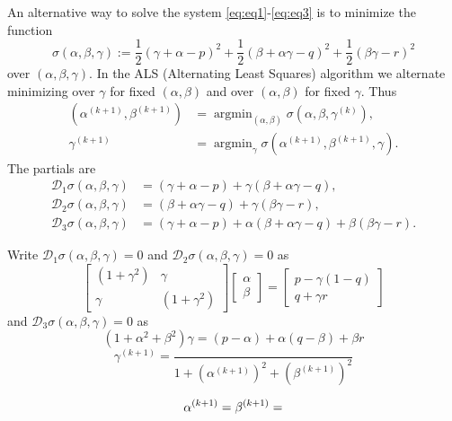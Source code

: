\documentclass[
  12pt,
]{article}
\begin{document}
An alternative way to solve the system \eqref{eq:eq1}-\eqref{eq:eq3} is to minimize the function
\begin{equation}
\sigma(\alpha,\beta,\gamma):=\frac12(\gamma+\alpha-p)^2+\frac12(\beta+\alpha\gamma-q)^2+\frac12(\beta\gamma-r)^2
\label{eq:lsloss}
\end{equation}
over \((\alpha,\beta,\gamma)\). In the ALS (Alternating Least Squares) algorithm we alternate
minimizing over \(\gamma\) for fixed \((\alpha,\beta)\) and over \((\alpha,\beta)\) for fixed \(\gamma\). Thus
\begin{align}
(\alpha^{(k+1)},\beta^{(k+1)})&=\mathop{\text{argmin}}_{(\alpha,\beta)}\sigma(\alpha,\beta,\gamma^{(k)}),\\
\gamma^{(k+1)}&=\mathop{\text{argmin}}_\gamma\sigma(\alpha^{(k+1)},\beta^{(k+1)},\gamma).
\end{align}
The partials are
\begin{align}
\mathcal{D}_1\sigma(\alpha,\beta,\gamma)&=(\gamma+\alpha-p)+\gamma(\beta+\alpha\gamma-q),\\
\mathcal{D}_2\sigma(\alpha,\beta,\gamma)&=(\beta+\alpha\gamma-q)+\gamma(\beta\gamma-r),\\
\mathcal{D}_3\sigma(\alpha,\beta,\gamma)&=(\gamma+\alpha-p)+\alpha(\beta+\alpha\gamma-q)+\beta(\beta\gamma-r).
\end{align}

Write \(\mathcal{D}_1\sigma(\alpha,\beta,\gamma)=0\) and \(\mathcal{D}_2\sigma(\alpha,\beta,\gamma)=0\) as
\begin{equation}
\begin{bmatrix}(1+\gamma^2)&\gamma\\\gamma&(1+\gamma^2)\end{bmatrix}
\begin{bmatrix}\alpha\\\beta\end{bmatrix}=\begin{bmatrix}p-\gamma(1-q)\\
q+\gamma r\end{bmatrix}
\end{equation}
and \(\mathcal{D}_3\sigma(\alpha,\beta,\gamma)=0\) as
\[
(1+\alpha^2+\beta^2)\gamma=(p-\alpha)+\alpha(q-\beta)+\beta r
\]
\[
\gamma^{(k+1)}=\frac{}{1+(\alpha^{(k+1)})^2+(\beta^{(k+1)})^2}
\]

\[
\alpha^{(k+1)}=\\
\beta^{(k+1)}=
\]
\end{document}
